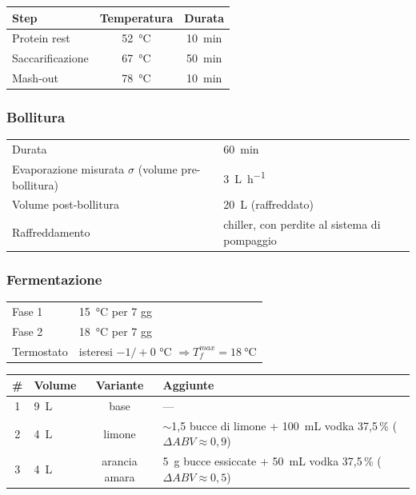 \medskip
\begin{tabularx}{\linewidth}{@{}Xcc@{}}
\toprule
Step & Temperatura & Durata \\
\midrule
Protein rest & \SI{52}{\celsius} & \SI{10}{\minute} \\
Saccarificazione & \SI{67}{\celsius} & \SI{50}{\minute} \\
Mash-out & \SI{78}{\celsius} & \SI{10}{\minute} \\
\bottomrule
\end{tabularx}

\subsubsection*{Bollitura}
\begin{tabularx}{\linewidth}{@{}lX@{}}
\toprule
Durata & \SI{60}{\minute} \\
Evaporazione misurata $\sigma$ (volume pre-bollitura) & \SI{3}{\liter\per\hour} \\
Volume post-bollitura & \SI{20}{\liter} (raffreddato) \\
Raffreddamento & chiller, con perdite al sistema di pompaggio \\
\bottomrule
\end{tabularx}

\subsubsection*{Fermentazione}
\begin{tabularx}{\linewidth}{@{}lX@{}}
\toprule
Fase 1 & \SI{15}{\celsius} per 7 gg \\
Fase 2 & \SI{18}{\celsius} per 7 gg \\
Termostato & isteresi $-1/+0$ \si{\celsius} $\Rightarrow T_f^{max} = \SI{18}{\celsius}$ \\
\bottomrule
\end{tabularx}

\medskip
\begin{tabularx}{\linewidth}{@{}clcX@{}}
\toprule
\# & Volume & Variante & Aggiunte \\
\midrule
1 & \SI{9}{\liter} & base & --- \\
2 & \SI{4}{\liter} & limone & $\sim$1,5 bucce di limone + \SI{100}{\milli\liter} vodka 37,5\,\% ($\Delta ABV \approx 0{,}9$) \\
3 & \SI{4}{\liter} & arancia amara & \SI{5}{\gram} bucce essiccate + \SI{50}{\milli\liter} vodka 37,5\,\% ($\Delta ABV \approx 0{,}5$) \\
\bottomrule
\end{tabularx}


